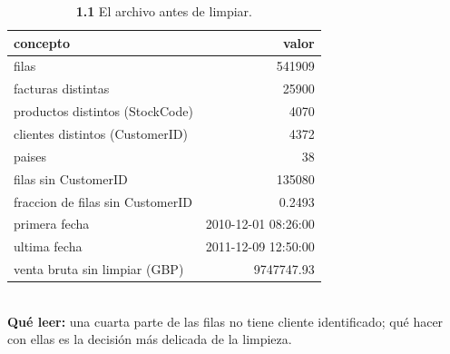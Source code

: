 \begin{table}[htbp]
\centering
\footnotesize
\caption{\textbf{1.1} El archivo antes de limpiar.}
\label{tab:p1_conteos}
\begin{tabular}{lr}
\toprule
\textbf{concepto} & \textbf{valor} \\
\midrule
filas & 541909 \\
facturas distintas & 25900 \\
productos distintos (StockCode) & 4070 \\
clientes distintos (CustomerID) & 4372 \\
paises & 38 \\
filas sin CustomerID & 135080 \\
fraccion de filas sin CustomerID & 0.2493 \\
primera fecha & 2010-12-01 08:26:00 \\
ultima fecha & 2011-12-09 12:50:00 \\
venta bruta sin limpiar (GBP) & 9747747.93 \\
\bottomrule
\end{tabular}
\\[0.3em]{\scriptsize \textbf{Qu\'e leer:} una cuarta parte de las filas no tiene cliente identificado; qu\'e hacer con ellas es la decisi\'on m\'as delicada de la limpieza.}
\end{table}
